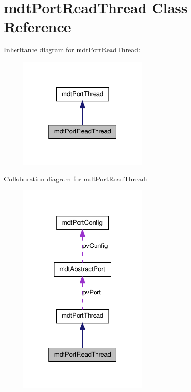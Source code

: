 \hypertarget{classmdt_port_read_thread}{
\section{mdtPortReadThread Class Reference}
\label{classmdt_port_read_thread}
}


Inheritance diagram for mdtPortReadThread:\nopagebreak
\begin{figure}[H]
\begin{center}
\leavevmode
\includegraphics[width=184pt]{classmdt_port_read_thread__inherit__graph}
\end{center}
\end{figure}


Collaboration diagram for mdtPortReadThread:\nopagebreak
\begin{figure}[H]
\begin{center}
\leavevmode
\includegraphics[width=184pt]{classmdt_port_read_thread__coll__graph}
\end{center}
\end{figure}

